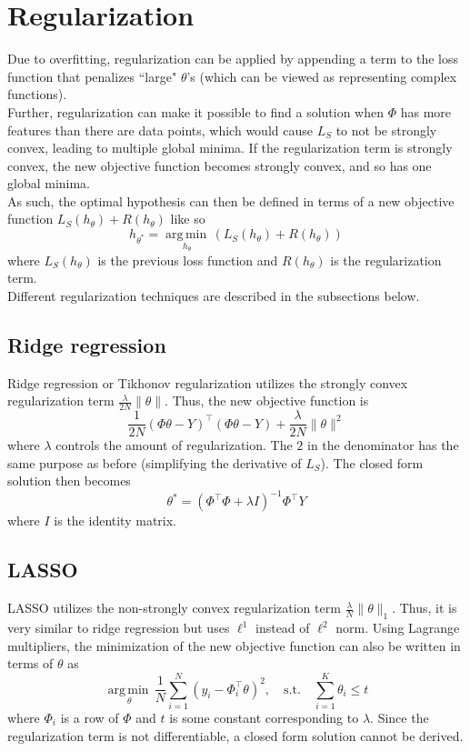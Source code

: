 \documentclass[12pt]{article}
\newcommand{\norm}[1]{\lVert#1\rVert}
\newcommand{\argmin}[1]{\underset{#1}{\operatorname{arg\,min\,}}}
\begin{document}
\section{Regularization}

Due to overfitting, regularization can be applied by appending a term to the loss function that penalizes ``large" $\theta$'s (which can be viewed as representing complex functions).
\\\newline
Further, regularization can make it possible to find a solution when $\Phi$ has more features than there are data points, which would cause $L_S$ to not be strongly convex, leading to multiple global minima. If the regularization term is strongly convex, the new objective function becomes strongly convex, and so has one global minima.
\\\newline
As such, the optimal hypothesis can then be defined in terms of a new objective function $L_S(h_\theta) + R(h_\theta)$ like so
\[ h_{\theta^*} = \argmin{h_\theta}(L_S(h_\theta) + R(h_\theta)) \]
where $L_S(h_\theta)$ is the previous loss function and $R(h_\theta)$ is the regularization term.
\\\newline
Different regularization techniques are described in the subsections below.

\subsection{Ridge regression}

Ridge regression or Tikhonov regularization utilizes the strongly convex regularization term $\frac{\lambda}{2N}\norm{\theta}$. Thus, the new objective function is
\[ \frac{1}{2N}(\Phi\theta - Y)^\top(\Phi\theta - Y) + \frac{\lambda}{2N}\norm{\theta}^2 \]
where $\lambda$ controls the amount of regularization. The $2$ in the denominator has the same purpose as before (simplifying the derivative of $L_S$). The closed form solution then becomes
\[ \theta^* = (\Phi^\top\Phi + \lambda I)^{-1}\Phi^\top Y \]
where $I$ is the identity matrix.

\subsection{LASSO}

LASSO utilizes the non-strongly convex regularization term $\frac{\lambda}{N}\norm{\theta}_1$. Thus, it is very similar to ridge regression but uses $\ell^1$ instead of $\ell^2$ norm. Using Lagrange multipliers, the minimization of the new objective function can also be written in terms of $\theta$ as
\[ \argmin{\theta}\frac{1}{N}\sum_{i=1}^{N}(y_i - \Phi_i^\top\theta)^2, \quad \text{s.t.} \quad \sum_{i=1}^{K}\theta_i \leq t \]
where $\Phi_i$ is a row of $\Phi$ and $t$ is some constant corresponding to $\lambda$. Since the regularization term is not differentiable, a closed form solution cannot be derived.
\end{document}
